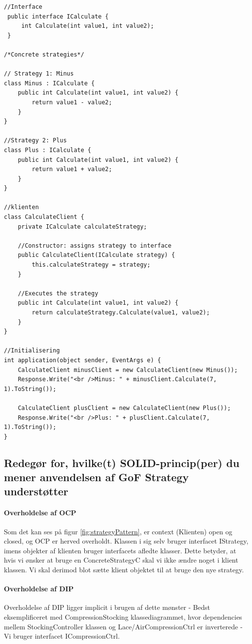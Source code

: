 \begin{lstlisting}
//Interface
 public interface ICalculate {
	 int Calculate(int value1, int value2);
 }

/*Concrete strategies*/

// Strategy 1: Minus
class Minus : ICalculate {
	public int Calculate(int value1, int value2) {
		return value1 - value2;
	}
}

//Strategy 2: Plus
class Plus : ICalculate {
	public int Calculate(int value1, int value2) {
		return value1 + value2;
	}
}

//klienten
class CalculateClient {
	private ICalculate calculateStrategy;

	//Constructor: assigns strategy to interface
	public CalculateClient(ICalculate strategy) {
		this.calculateStrategy = strategy;
	}

	//Executes the strategy
	public int Calculate(int value1, int value2) {
		return calculateStrategy.Calculate(value1, value2);
	}
}

//Initialisering
int application(object sender, EventArgs e) {
	CalculateClient minusClient = new CalculateClient(new Minus());
	Response.Write("<br />Minus: " + minusClient.Calculate(7, 1).ToString());

	CalculateClient plusClient = new CalculateClient(new Plus());
	Response.Write("<br />Plus: " + plusClient.Calculate(7, 1).ToString());
}

\end{lstlisting}

\subsection{Redegør for, hvilke(t) SOLID-princip(per) du mener anvendelsen af GoF Strategy understøtter}

\paragraph{Overholdelse af OCP}
Som det kan ses på figur \ref{fig:strategyPattern}, er context (Klienten) open og closed, og OCP er herved overholdt. Klassen i sig selv bruger interfacet IStrategy, imens objekter af klienten bruger interfacets afledte klasser. Dette betyder, at hvis vi ønsker at bruge en ConcreteStrategyC skal vi ikke ændre noget i klient klassen. Vi skal derimod blot sætte klient objektet til at bruge den nye strategy.

\paragraph{Overholdelse af DIP}
Overholdelse af DIP ligger implicit i brugen af dette mønster - Bedst eksemplificeret med CompressionStocking klassediagrammet, hvor dependencies mellem StockingController klassen og Lace/AirCompressionCtrl er inverterede - Vi bruger interfacet ICompressionCtrl.  

